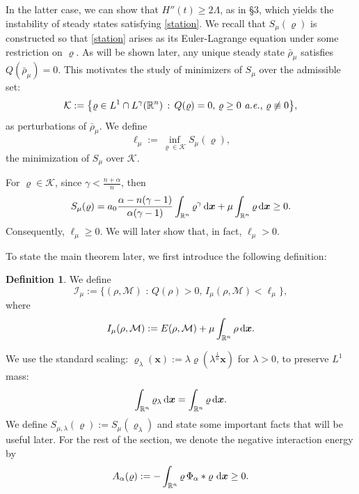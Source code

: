 \documentclass[reqno,11pt]{amsart}
\numberwithin{equation}{section}
\theoremstyle{definition}
\newtheorem{definition}[theorem]{Definition}
\def\dd{{\, \rm d}}
\begin{document}
In the latter case, we can show that $H''(t) \geq 2 \Lambda$, as in \S 3,
which yields the instability of steady states satisfying \eqref{station}. 
We recall that $S_\mu(\varrho)$ is constructed so that \eqref{station} arises as its 
Euler-Lagrange equation 
under some restriction on $\varrho$. 
As will be shown later, any unique steady state $\bar\rho_\mu$ satisfies $Q(\bar\rho_\mu) = 0$. 
This motivates the study of minimizers of $S_\mu$ over the admissible set:
\[
\mathcal{K} := \big\{ \varrho \in L^1 \cap L^\gamma(\mathbb{R}^n) \, : \, Q(\varrho) = 0, 
\, \varrho \geq 0 \text{ {\it a.e.}, } \varrho \not\equiv 0\big\},
\]
as perturbations of $\bar\rho_\mu$. We define 
\begin{equation*}
\ell_\mu := \inf_{\varrho \in \mathcal{K}} S_\mu(\varrho),
\end{equation*}
the minimization of $S_\mu$ over $\mathcal{K}$. 

For $\varrho \in \mathcal{K}$, since $\gamma < \frac{n + \alpha}{n}$, then
\begin{equation}\label{overk}
S_\mu(\varrho) = a_0\frac{\alpha - n(\gamma - 1)}{\alpha(\gamma - 1)}\int_{\mathbb{R}^n} \varrho^\gamma \dd \boldsymbol{x} + \mu \int_{\mathbb{R}^n} \varrho \dd \boldsymbol{x} \geq 0.
\end{equation}
Consequently, $\ell_\mu \geq 0$. We will later show that, in fact, $\ell_\mu > 0$. 

To state the main theorem later, we first introduce the following definition:
\begin{definition}
We define
    \[
 \mathcal{I}_\mu :=\big\{ (\rho,\mathcal{M}) \,\,: \, Q(\rho) > 0, 
 \, I_\mu(\rho,\mathcal{M})< \ell_\mu\big\},
    \]
    where
    $$
        I_\mu(\rho,\mathcal{M}):= E(\rho,\mathcal{M}) + \mu \int_{\mathbb{R}^n} \rho \dd \boldsymbol{x}.
    $$
\end{definition}

We use the standard scaling: 
$\varrho_\lambda(\boldsymbol{x}) := 
\lambda \varrho(\lambda^\frac{1}{n} \boldsymbol{x})$ for $\lambda > 0$,
to preserve $L^1$ mass:
\[
\int_{\mathbb{R}^n} \varrho_\lambda \dd \boldsymbol{x} = \int_{\mathbb{R}^n} \varrho \dd \boldsymbol{x}.
\]
We define $S_{\mu,\lambda}(\varrho) := S_\mu(\varrho_\lambda)$ and state some important facts that will be useful later. For the rest of the section, we denote the negative interaction energy  by
\[
    A_\alpha(\varrho):=-\int_{\mathbb R^n}\varrho\,\Phi_\alpha*\varrho\,\dd \boldsymbol{x} \ge 0.
\]
\end{document}
